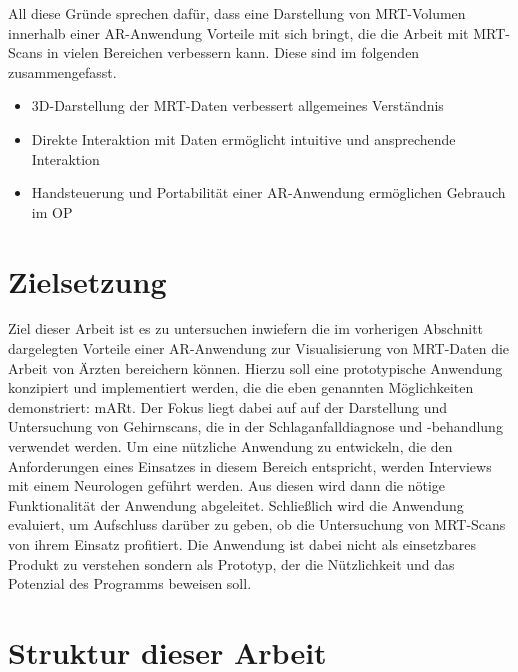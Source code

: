 All diese Gründe sprechen dafür, dass eine Darstellung von MRT-Volumen innerhalb einer AR-Anwendung Vorteile mit sich bringt, die die Arbeit mit MRT-Scans in vielen Bereichen verbessern kann. Diese sind im folgenden zusammengefasst.

\begin{itemize}
\item 3D-Darstellung der MRT-Daten verbessert allgemeines Verständnis 
\item Direkte Interaktion mit Daten ermöglicht intuitive und ansprechende Interaktion
\item Handsteuerung und Portabilität einer AR-Anwendung ermöglichen Gebrauch im OP
\end{itemize}

\section{Zielsetzung}

Ziel dieser Arbeit ist es zu untersuchen inwiefern die im vorherigen Abschnitt dargelegten Vorteile einer AR-Anwendung zur Visualisierung von MRT-Daten die Arbeit von Ärzten bereichern können.
Hierzu soll eine prototypische Anwendung konzipiert und implementiert werden, die die eben genannten Möglichkeiten demonstriert: mARt. 
Der Fokus liegt dabei auf auf der Darstellung und Untersuchung von Gehirnscans, die in der Schlaganfalldiagnose und -behandlung verwendet werden.
Um eine nützliche Anwendung zu entwickeln, die den Anforderungen eines Einsatzes in diesem Bereich entspricht, werden Interviews mit einem Neurologen geführt werden. Aus diesen wird dann die nötige Funktionalität der Anwendung abgeleitet. 
Schließlich wird die Anwendung evaluiert, um Aufschluss darüber zu geben, ob die Untersuchung von MRT-Scans von ihrem Einsatz profitiert.
Die Anwendung ist dabei nicht als einsetzbares Produkt zu verstehen sondern als Prototyp, der die Nützlichkeit und das Potenzial des Programms beweisen soll.

\section{Struktur dieser Arbeit}

